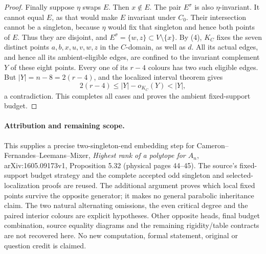 \documentclass[11pt,a4paper]{article}
\begin{document}
\begin{proof}
Finally suppose $\eta$ swaps $E$. Then $x\notin E$.
The pair $E^\sigma$ is also $\eta$-invariant. It cannot equal $E$,
as that would make $E$ invariant under $C_0$. Their intersection
cannot be a singleton, because $\eta$ would fix that singleton
and hence both points of $E$. Thus they are disjoint, and
$E^\sigma=\{w,z\}\subset V\setminus\{x\}$.
By (4), $K_C$ fixes the seven distinct points
$a,b,x,u,v,w,z$ in the $C$-domain, as well as $d$.
All its actual edges, and hence all its ambient-eligible edges,
are confined to the invariant complement $Y$ of these eight points.
Every one of its $r-4$ colours has two such eligible edges.
But $|Y|=n-8=2(r-4)$, and the localized interval theorem gives
\[
              2(r-4)\le |Y|-o_{K_C}(Y)<|Y|,
\]
a contradiction. This completes all cases and proves the ambient
fixed-support budget.
\end{proof}

\paragraph{Attribution and remaining scope.}
This supplies a precise two-singleton-end embedding step for
Cameron--Fernandes--Leemans--Mixer, \emph{Highest rank of a polytope
for $A_n$}, arXiv:1605.09173v1, Proposition 5.32 (physical pages
44--45). The source's fixed-support budget strategy and the complete
accepted odd singleton and selected-localization proofs are reused.
The additional argument proves which local fixed points survive the
opposite generator; it makes no general parabolic inheritance claim.
The two natural alternating omissions, the even critical degree and
the paired interior colours are explicit hypotheses. Other opposite
heads, final budget combination, source equality diagrams and the
remaining rigidity/table contracts are not recovered here. No new
computation, formal statement, original or question credit is claimed.
\end{document}

